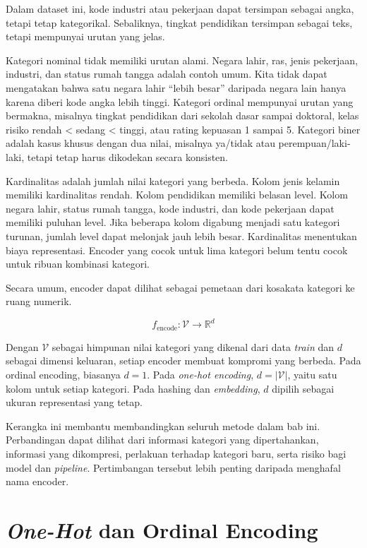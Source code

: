 Dalam dataset ini, kode industri atau pekerjaan dapat tersimpan sebagai angka, tetapi tetap kategorikal. Sebaliknya, tingkat pendidikan tersimpan sebagai teks, tetapi mempunyai urutan yang jelas.

Kategori nominal tidak memiliki urutan alami. Negara lahir, ras, jenis pekerjaan, industri, dan status rumah tangga adalah contoh umum. Kita tidak dapat mengatakan bahwa satu negara lahir ``lebih besar'' daripada negara lain hanya karena diberi kode angka lebih tinggi. Kategori ordinal mempunyai urutan yang bermakna, misalnya tingkat pendidikan dari sekolah dasar sampai doktoral, kelas risiko rendah \textless{} sedang \textless{} tinggi, atau rating kepuasan 1 sampai 5. Kategori biner adalah kasus khusus dengan dua nilai, misalnya ya/tidak atau perempuan/laki-laki, tetapi tetap harus dikodekan secara konsisten.

Kardinalitas adalah jumlah nilai kategori yang berbeda. Kolom jenis kelamin memiliki kardinalitas rendah. Kolom pendidikan memiliki belasan level. Kolom negara lahir, status rumah tangga, kode industri, dan kode pekerjaan dapat memiliki puluhan level. Jika beberapa kolom digabung menjadi satu kategori turunan, jumlah level dapat melonjak jauh lebih besar. Kardinalitas menentukan biaya representasi. Encoder yang cocok untuk lima kategori belum tentu cocok untuk ribuan kombinasi kategori.

Secara umum, encoder dapat dilihat sebagai pemetaan dari kosakata kategori ke ruang numerik.

\[
f_{\text{encode}} : \mathcal{V} \rightarrow \mathbb{R}^d
\]

Dengan \(\mathcal{V}\) sebagai himpunan nilai kategori yang dikenal dari data \emph{train} dan \(d\) sebagai dimensi keluaran, setiap encoder membuat kompromi yang berbeda. Pada ordinal encoding, biasanya \(d = 1\). Pada \emph{one-hot encoding}, \(d = |\mathcal{V}|\), yaitu satu kolom untuk setiap kategori. Pada hashing dan \emph{embedding}, \(d\) dipilih sebagai ukuran representasi yang tetap.

Kerangka ini membantu membandingkan seluruh metode dalam bab ini. Perbandingan dapat dilihat dari informasi kategori yang dipertahankan, informasi yang dikompresi, perlakuan terhadap kategori baru, serta risiko bagi model dan \emph{pipeline}. Pertimbangan tersebut lebih penting daripada menghafal nama encoder.

\section{\texorpdfstring{\emph{One-Hot} dan Ordinal Encoding}{One-Hot dan Ordinal Encoding}}\label{one-hot-dan-ordinal-encoding}

